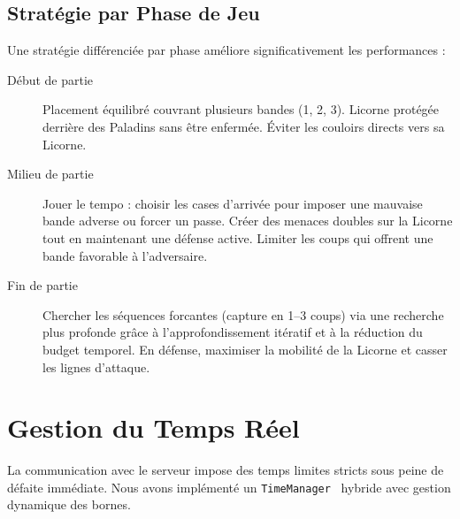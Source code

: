 \documentclass[12pt,a4paper]{article}
\begin{document}
\subsection{Stratégie par Phase de Jeu}
Une stratégie différenciée par phase améliore significativement les performances :
\begin{description}
    \item[Début de partie] Placement équilibré couvrant plusieurs bandes (1, 2, 3). Licorne protégée derrière des Paladins sans être enfermée. Éviter les couloirs directs vers sa Licorne.
    \item[Milieu de partie] Jouer le tempo : choisir les cases d'arrivée pour imposer une mauvaise bande adverse ou forcer un passe. Créer des menaces doubles sur la Licorne tout en maintenant une défense active. Limiter les coups qui offrent une bande favorable à l'adversaire.
    \item[Fin de partie] Chercher les séquences forcantes (capture en 1--3 coups) via une recherche plus profonde grâce à l'approfondissement itératif et à la réduction du budget temporel. En défense, maximiser la mobilité de la Licorne et casser les lignes d'attaque.
\end{description}

\section{Gestion du Temps Réel}
\label{sec:time}
La communication avec le serveur impose des temps limites stricts sous peine de défaite immédiate. Nous avons implémenté un \texttt{TimeManager}~\cite{cp_time} hybride avec gestion dynamique des bornes.
\end{document}
